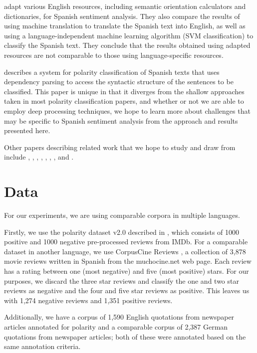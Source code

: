 \documentclass[11pt]{article}
\begin{document}
 adapt various English resources, including semantic orientation calculators and dictionaries, for Spanish sentiment analysis.  They also compare the results of using machine translation to translate the Spanish text into English, as well as using a language-independent machine learning algorithm (SVM classification) to classify the Spanish text.  They conclude that the results obtained using adapted resources are not comparable to those using language-specific resources.

 describes a system for polarity classification of Spanish texts that uses dependency parsing to access the syntactic structure of the sentences to be classified.  This paper is unique in that it diverges from the shallow approaches taken in most polarity classification papers, and whether or not we are able to employ deep processing techniques, we hope to learn more about challenges that may be specific to Spanish sentiment analysis from the approach and results presented here.

Other papers describing related work that we hope to study and draw from include , , , , , , , and .

\section{Data}

For our experiments, we are using comparable corpora in multiple languages.

Firstly, we use the polarity dataset v2.0 described in , which consists of 1000 positive and 1000 negative pre-processed reviews from IMDb.  For a comparable dataset in another language, we use CorpusCine Reviews \cite{cruzmata2011}, a collection of 3,878 movie reviews written in Spanish from the muchocine.net web page.  Each review has a rating between one (most negative) and five (most positive) stars.  For our purposes, we discard the three star reviews and classify the one and two star reviews as negative and the four and five star reviews as positive.  This leaves us with 1,274 negative reviews and 1,351 positive reviews.

Additionally, we have a corpus of 1,590 English quotations from newspaper articles annotated for polarity and a comparable corpus of 2,387 German quotations from newspaper articles; both of these were annotated based on the same annotation criteria.
\end{document}
